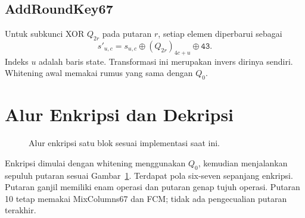 \subsection{AddRoundKey67}
Untuk subkunci XOR $Q_{2r}$ pada putaran $r$, setiap elemen diperbarui sebagai
\begin{equation}
  s'_{u,c}=s_{u,c}\oplus (Q_{2r})_{4c+u}\oplus\mathtt{43}.
\end{equation}
Indeks $u$ adalah baris state. Transformasi ini merupakan invers dirinya
sendiri. Whitening awal memakai rumus yang sama dengan $Q_0$.

\section{Alur Enkripsi dan Dekripsi}
\begin{figure}[htbp]
  \centering
  \caption{Alur enkripsi satu blok sesuai implementasi saat ini.}
  \label{fig:alur-enkripsi}
\end{figure}
Enkripsi dimulai dengan whitening menggunakan $Q_0$, kemudian menjalankan
sepuluh putaran sesuai Gambar~\ref{fig:alur-enkripsi}.
Terdapat pola six-seven sepanjang enkripsi. Putaran ganjil
memiliki enam operasi dan putaran genap tujuh operasi. Putaran 10 tetap
memakai MixColumns67 dan FCM; tidak ada pengecualian putaran terakhir.

